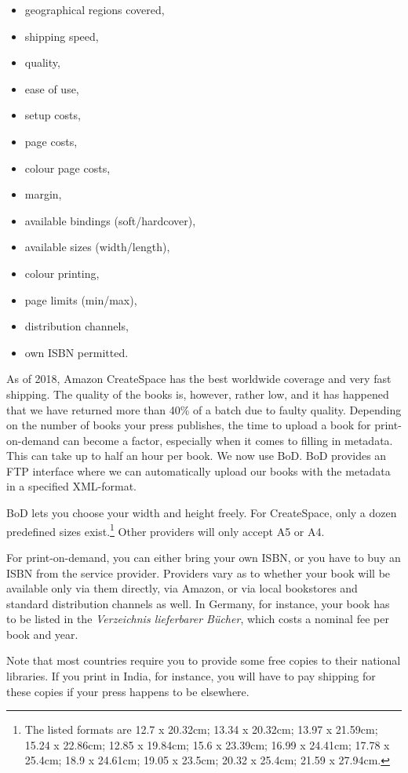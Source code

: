 \documentclass[nonflat,modfonts,output=book] {langsci/langscibook}
\begin{document}
\begin{itemize}
 \item geographical regions covered, 
 \item shipping speed,
 \item quality,
 \item ease of use, 
 \item setup costs, 
 \item page costs, 
 \item colour page costs, 
 \item margin,
 \item available bindings (soft/hardcover), 
 \item available sizes (width/length), 
 \item colour printing, 
 \item page limits (min/max),
 \item distribution channels,
 \item own ISBN permitted.
\end{itemize}

As of 2018, Amazon CreateSpace has the best worldwide coverage and very fast shipping. The quality of the books is, however, rather low, and it has happened that we have returned more than 40\% of a batch due to faulty quality. Depending on the number of books your press publishes, the time to upload a book for print-on-demand can become a factor, especially when it comes to filling in metadata. This can take up to half  an hour per book. We now use BoD. BoD provides an FTP interface where we can automatically upload our books with the metadata in a specified XML-format. 

BoD lets you choose your width and height freely. For CreateSpace, only a dozen  
 predefined sizes exist.\footnote{%
The listed formats are
12.7 x 20.32cm; 
13.34 x 20.32cm;
13.97 x 21.59cm;
15.24 x 22.86cm;
12.85 x 19.84cm;
15.6 x 23.39cm;
16.99 x 24.41cm;
17.78 x 25.4cm;
18.9 x 24.61cm;
19.05 x 23.5cm;
20.32 x 25.4cm;
21.59 x 27.94cm.} Other providers will only accept A5 or A4. 

For print-on-demand, you can either bring your own ISBN, or you have to buy an ISBN from the service provider. Providers vary as to whether your book will be available only via them directly, via Amazon, or via local bookstores and standard distribution channels as well. In Germany, for instance, your book has to be listed in the \textit{Verzeichnis lieferbarer Bücher}, which costs a nominal fee per book and year.

Note that most countries require you to provide some free copies to their national libraries. If you print in India, for instance, you will have to pay shipping for these copies if your press happens to be elsewhere.
\end{document}

